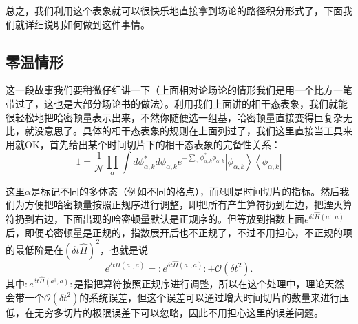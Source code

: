 \documentclass[12pt, a4paper, oneside]{ctexart}
\begin{document}
总之，我们利用这个表象就可以很快乐地直接拿到场论的路径积分形式了，下面我们就详细说明如何做到这件事情。

\subsection{零温情形}
这一段故事我们要稍微仔细讲一下（上面相对论场论的情形我们是用一个比方一笔带过了，这也是大部分场论书的做法）。利用我们上面讲的相干态表象，我们就能很轻松地把哈密顿量表示出来，不然你随便选一组基，哈密顿量直接变得巨复杂无比，就没意思了。具体的相干态表象的规则在上面列过了，我们这里直接当工具来用就OK，首先给出某个时间切片下的相干态表象的完备性关系：
\begin{equation}
    1=\frac{1}{\mathcal N}\prod_\alpha \int d\phi^*_{\alpha,k}d\phi_{\alpha,k}e^{-\sum_\alpha \phi^*_{\alpha,k}\phi_{\alpha,k}}\left|  \phi_{\alpha,k} \right> \left<  \phi_{\alpha,k}\right|
\end{equation}

这里$\alpha$是标记不同的多体态（例如不同的格点），而$k$则是时间切片的指标。然后我们为方便把哈密顿量按照正规序进行调整，即把所有产生算符扔到左边，把湮灭算符扔到右边，下面出现的哈密顿量默认是正规序的。但等放到指数上面$e^{\delta t \hat H(a^\dagger,a)}$后，即便哈密顿量是正规的，指数展开后也不正规了，不过不用担心，不正规的项的最低阶是在$(\delta t\hat H)^2$，也就是说
\begin{equation}
    e^{\delta t \hat H(a^\dagger,a)}=:e^{\delta t \hat H(a^\dagger,a)}:+\mathcal O(\delta t^2).
\end{equation}
其中$:e^{\delta t \hat H(a^\dagger,a)}:$是指把算符按照正规序进行调整，所以在这个处理中，理论天然会带一个$\mathcal O(\delta t^2)$的系统误差，但这个误差可以通过增大时间切片的数量来进行压低，在无穷多切片的极限误差下可以忽略，因此不用担心这里的误差问题。
\end{document}
